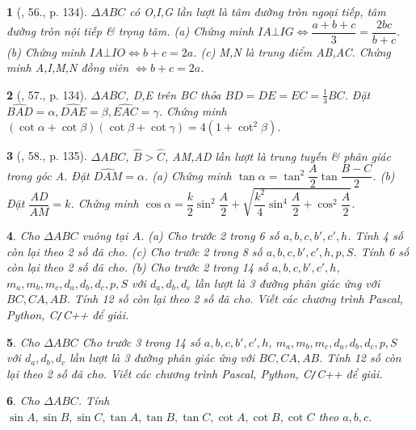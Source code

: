 \documentclass{article}
\newtheorem{baitoan}{}
\begin{document}
\begin{baitoan}[\cite{TLCT_hinh_hoc_10}, 56., p. 134]
	$\Delta ABC$ có O,I,G lần lượt là tâm đường tròn ngoại tiếp, tâm đường tròn nội tiếp \& trọng tâm. (a) Chứng minh $IA\bot IG\Leftrightarrow\dfrac{a + b + c}{3} = \dfrac{2bc}{b + c}$. (b) Chứng minh $IA\bot IO\Leftrightarrow b + c = 2a$. (c) M,N là trung điểm AB,AC. Chứng minh A,I,M,N đồng viên $\Leftrightarrow b + c = 2a$.
\end{baitoan}

\begin{baitoan}[\cite{TLCT_hinh_hoc_10}, 57., p. 134]
	$\Delta ABC$, D,E trên BC thỏa $BD = DE = EC = \frac{1}{3}BC$. Đặt $\widehat{BAD} = \alpha,\widehat{DAE} = \beta,\widehat{EAC} = \gamma$. Chứng minh $(\cot\alpha + \cot\beta)(\cot\beta + \cot\gamma) = 4(1 + \cot^2\beta)$.
\end{baitoan}

\begin{baitoan}[\cite{TLCT_hinh_hoc_10}, 58., p. 135]
	$\Delta ABC$, $\widehat{B} > \widehat{C}$, AM,AD lần lượt là trung tuyến \& phân giác trong góc A. Đặt $\widehat{DAM} = \alpha$. (a) Chứng minh $\tan\alpha = \tan^2\dfrac{A}{2}\tan\dfrac{B - C}{2}$. (b) Đặt $\dfrac{AD}{AM} = k$. Chứng minh $\cos\alpha = \dfrac{k}{2}\sin^2\dfrac{A}{2} + \sqrt{\dfrac{k^2}{4}\sin^4\dfrac{A}{2} + \cos^2\dfrac{A}{2}}$.
\end{baitoan}

\begin{baitoan}
	Cho $\Delta ABC$ vuông tại $A$. (a) Cho trước 2 trong 6 số $a,b,c,b',c',h$. Tính 4 số còn lại theo 2 số đã cho. (c) Cho trước 2 trong 8 số $a,b,c,b',c',h,p,S$. Tính 6 số còn lại theo 2 số đã cho. (b) Cho trước 2 trong 14 số $a,b,c,b',c',h$, $m_a,m_b,m_c,d_a,d_b,d_c,p,S$ với $d_a,d_b,d_c$ lần lượt là 3 đường phân giác ứng với $BC,CA,AB$. Tính 12 số còn lại theo 2 số đã cho. Viết các chương trình {\sf Pascal, Python, C{\tt/}C++} để giải.
\end{baitoan}

\begin{baitoan}
	Cho $\Delta ABC$ Cho trước 3 trong 14 số $a,b,c,b',c',h$, $m_a,m_b,m_c,d_a,d_b,d_c,p,S$ với $d_a,d_b,d_c$ lần lượt là 3 đường phân giác ứng với $BC,CA,AB$. Tính 12 số còn lại theo 2 số đã cho. Viết các chương trình {\sf Pascal, Python, C{\tt/}C++} để giải.
\end{baitoan}

\begin{baitoan}
	Cho $\Delta ABC$. Tính $\sin A,\sin B,\sin C,\tan A,\tan B,\tan C,\cot A,\cot B,\cot C$ theo $a,b,c$.
\end{baitoan}
\end{document}
